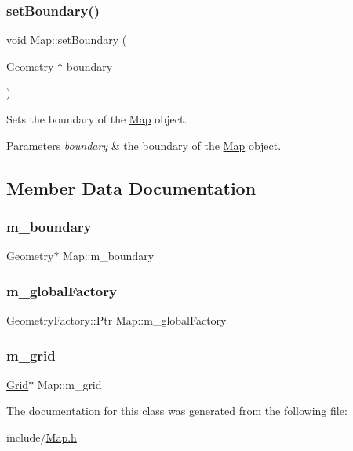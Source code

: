 \subsubsection{\texorpdfstring{set\+Boundary()}{setBoundary()}}
{\footnotesize\ttfamily void Map\+::set\+Boundary (\begin{DoxyParamCaption}\item[{Geometry $\ast$}]{boundary }\end{DoxyParamCaption})}

Sets the boundary of the \hyperlink{class_map}{Map} object. 
\begin{DoxyParams}{Parameters}
{\em boundary} & the boundary of the \hyperlink{class_map}{Map} object. \\
\hline
\end{DoxyParams}


\subsection{Member Data Documentation}
\mbox{\label{class_map_af2c95561cb4ff3b9950240351cf4303c}} 
\subsubsection{\texorpdfstring{m\+\_\+boundary}{m\_boundary}}
{\footnotesize\ttfamily Geometry$\ast$ Map\+::m\+\_\+boundary\hspace{0.3cm}{\ttfamily [private]}}

\mbox{\label{class_map_ac5f30e6c144955a3638192495fd7d843}} 
\subsubsection{\texorpdfstring{m\+\_\+global\+Factory}{m\_globalFactory}}
{\footnotesize\ttfamily Geometry\+Factory\+::\+Ptr Map\+::m\+\_\+global\+Factory\hspace{0.3cm}{\ttfamily [private]}}

\mbox{\label{class_map_a0fc16621dbe307d36170c3a96b24b7d9}} 
\subsubsection{\texorpdfstring{m\+\_\+grid}{m\_grid}}
{\footnotesize\ttfamily \hyperlink{class_grid}{Grid}$\ast$ Map\+::m\+\_\+grid\hspace{0.3cm}{\ttfamily [private]}}



The documentation for this class was generated from the following file\+:\begin{DoxyCompactItemize}
\item 
include/\hyperlink{_map_8h}{Map.\+h}\end{DoxyCompactItemize}
